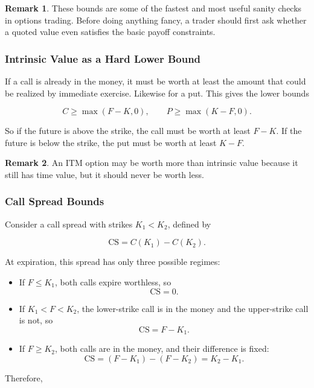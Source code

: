 \documentclass[11pt]{article}
\theoremstyle{definition}
\newtheorem{remark}{Remark}[section]
\begin{document}
\begin{remark}
These bounds are some of the fastest and most useful sanity checks in options trading. Before doing anything fancy, a trader should first ask whether a quoted value even satisfies the basic payoff constraints.
\end{remark}

\subsubsection{Intrinsic Value as a Hard Lower Bound}

If a call is already in the money, it must be worth at least the amount that could be realized by immediate exercise. Likewise for a put. This gives the lower bounds

\[
C \ge \max(F-K,0),
\qquad
P \ge \max(K-F,0).
\]

So if the future is above the strike, the call must be worth at least \(F-K\). If the future is below the strike, the put must be worth at least \(K-F\).

\begin{remark}
An ITM option may be worth more than intrinsic value because it still has time value, but it should never be worth less.
\end{remark}

\subsubsection{Call Spread Bounds}

Consider a call spread with strikes \(K_1 < K_2\), defined by

\[
\text{CS} = C(K_1) - C(K_2).
\]

At expiration, this spread has only three possible regimes:

\begin{itemize}[leftmargin=2em]
    \item If \(F \le K_1\), both calls expire worthless, so
    \[
    \text{CS} = 0.
    \]
    \item If \(K_1 < F < K_2\), the lower-strike call is in the money and the upper-strike call is not, so
    \[
    \text{CS} = F-K_1.
    \]
    \item If \(F \ge K_2\), both calls are in the money, and their difference is fixed:
    \[
    \text{CS} = (F-K_1) - (F-K_2) = K_2-K_1.
    \]
\end{itemize}

Therefore,
\end{document}
